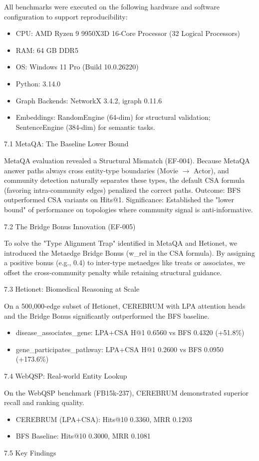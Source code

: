 \documentclass[10pt,journal,compsoc]{IEEEtran}
\begin{document}
All benchmarks were executed on the following hardware and software confi\-guration to support repro\-ducibility:
\begin{itemize}
\item CPU: AMD Ryzen 9 9950X3D 16-Core Processor (32 Logical Processors)
\item RAM: 64 GB DDR5
\item OS: Windows 11 Pro (Build 10.0.26220)
\item Python: 3.14.0
\item Graph Backends: NetworkX 3.4.2, igraph 0.11.6
\item Embeddings: RandomEngine (64-dim) for structural validation; SentenceEngine (384-dim) for semantic tasks.

\end{itemize}
7.1 MetaQA: The Baseline Lower Bound

MetaQA evaluation revealed a Structural Mismatch (EF-004). Because MetaQA answer paths always cross entity-type boundaries (Movie $\to$ Actor), and community detection naturally separates these types, the default CSA formula (favoring intra-community edges) penalized the correct paths.
Outcome: BFS outpe\-rformed CSA variants on Hits@1.
Signif\-icance: Established the "lower bound" of performance on topologies where community signal is anti-informative.

7.2 The Bridge Bonus Innovation (EF-005)

To solve the "Type Alignment Trap" identified in MetaQA and Hetionet, we introduced the Metaedge Bridge Bonus (w\_rel in the CSA formula). By assigning a positive bonus (e.g., 0.4) to inter-type metaedges like treats or associates, we offset the cross-community penalty while retaining structural guidance.

7.3 Hetionet: Biomedical Reasoning at Scale

On a 500,000-edge subset of Hetionet, CEREBRUM with LPA attention heads and the Bridge Bonus signi\-ficantly outpe\-rformed the BFS baseline.
\begin{itemize}
\item disease\_associates\_gene: LPA+CSA H@1 0.6560 vs BFS 0.4320 (+51.8\%)
\item gene\_participates\_pathway: LPA+CSA H@1 0.2600 vs BFS 0.0950 (+173.6\%)

\end{itemize}
7.4 WebQSP: Real-world Entity Lookup

On the WebQSP benchmark (FB15k-237), CEREBRUM demon\-strated superior recall and ranking quality.
\begin{itemize}
\item CEREBRUM (LPA+CSA): Hits@10 0.3360, MRR 0.1203
\item BFS Baseline: Hits@10 0.3000, MRR 0.1081

\end{itemize}
7.5 Key Findings
\end{document}
